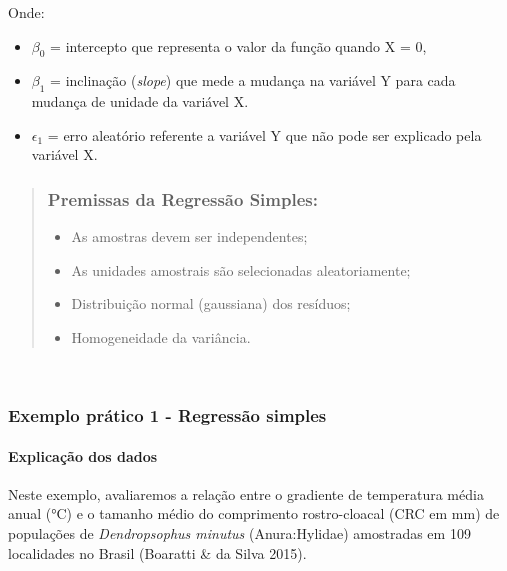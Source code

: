 \documentclass[
]{book}
\providecommand{\tightlist}{%
  \setlength{\itemsep}{0pt}\setlength{\parskip}{0pt}}
\begin{document}
Onde:

\begin{itemize}
\item
  \(\beta_0\) = intercepto que representa o valor da função quando X = 0,
\item
  \(\beta_{1}\) = inclinação (\emph{slope}) que mede a mudança na variável Y para cada mudança de unidade da variável X.
\item
  \(\epsilon_{1}\) = erro aleatório referente a variável Y que não pode ser explicado pela variável X.
\end{itemize}

\begin{quote}
\hypertarget{premissas-da-regressuxe3o-simples}{%
\subsubsection{Premissas da Regressão Simples:}\label{premissas-da-regressuxe3o-simples}}

\begin{itemize}
\tightlist
\item
  As amostras devem ser independentes;
\item
  As unidades amostrais são selecionadas aleatoriamente;
\item
  Distribuição normal (gaussiana) dos resíduos;
\item
  Homogeneidade da variância.
\end{itemize}
\end{quote}

~

\hypertarget{exemplo-pruxe1tico-1---regressuxe3o-simples}{%
\subsubsection{Exemplo prático 1 - Regressão simples}\label{exemplo-pruxe1tico-1---regressuxe3o-simples}}

\hypertarget{explicauxe7uxe3o-dos-dados-4}{%
\paragraph{Explicação dos dados}\label{explicauxe7uxe3o-dos-dados-4}}

Neste exemplo, avaliaremos a relação entre o gradiente de temperatura média anual (°C) e o tamanho médio do comprimento rostro-cloacal (CRC em mm) de populações de \emph{Dendropsophus minutus} (Anura:Hylidae) amostradas em 109 localidades no Brasil (Boaratti \& da Silva 2015).
\end{document}
